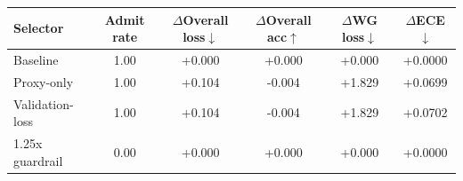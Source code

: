 \begin{tabular}{lccccc}
  \toprule
  Selector & Admit rate & $\Delta$Overall loss$\downarrow$ & $\Delta$Overall acc$\uparrow$ & $\Delta$WG loss$\downarrow$ & $\Delta$ECE$\downarrow$ \\
  \midrule
  Baseline & 1.00 & +0.000 & +0.000 & +0.000 & +0.0000 \\
  Proxy-only & 1.00 & +0.104 & -0.004 & +1.829 & +0.0699 \\
  Validation-loss & 1.00 & +0.104 & -0.004 & +1.829 & +0.0702 \\
  1.25x guardrail & 0.00 & +0.000 & +0.000 & +0.000 & +0.0000 \\
  \bottomrule
\end{tabular}
